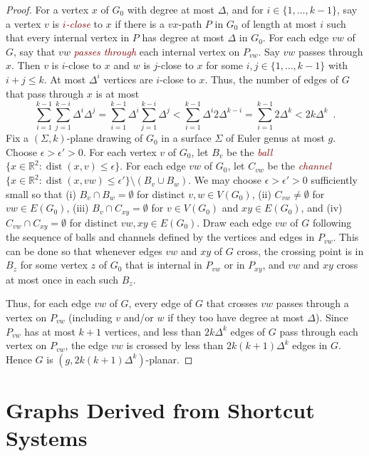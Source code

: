 \documentclass{patmorin}
\theoremstyle{plain}
\theoremstyle{definition}
\newcommand{\defin}[1]{\textcolor{Maroon}{\emph{#1}}}
\DeclareMathOperator{\dist}{dist}
\renewcommand{\leq}{\leqslant}
\begin{document}
\begin{proof}
  For a vertex $x$ of $G_0$ with degree at most $\Delta$, and for $i\in\{1,\dots,k-1\}$, say a vertex $v$ is \defin{$i$-close} to $x$ if there is a $vx$-path $P$ in $G_0$ of length at most $i$ such that every internal vertex in $P$  has degree at most $\Delta$ in $G_0$.
  For each edge $vw$ of $G$, say that $vw$ \defin{passes through} each internal vertex on $P_{vw}$.  Say $vw$ passes through $x$. Then $v$ is $i$-close to $x$ and $w$ is $j$-close to $x$ for some $i,j\in\{1,\dots,k-1\}$ with $i+j\leq k$. At most $\Delta^{i}$ vertices are $i$-close to $x$.
  Thus, the number of edges of $G$ that pass through $x$ is at most
  \[
  \sum_{i=1}^{k-1} \sum_{j=1}^{k-i} \Delta^i \Delta^j
  = \sum_{i=1}^{k-1} \Delta^i  \sum_{j=1}^{k-i} \Delta^j
  < \sum_{i=1}^{k-1} \Delta^i  2 \Delta^{k-i}
  = \sum_{i=1}^{k-1} 2\Delta^k
  < 2k \Delta^k \enspace.
  \]
  Fix a $(\Sigma,k)$-plane drawing of $G_0$ in a surface $\Sigma$ of Euler genus at most $g$. Choose $\epsilon>\epsilon'>0$.
  For each vertex $v$ of $G_0$, let $B_v$ be the \defin{ball} $\{x\in \mathbb{R}^2:\dist(x,v)\leq\epsilon\}$.
  For each edge $vw$ of $G_0$, let $C_{vw}$ be the \defin{channel} $\{x\in \mathbb{R}^2:\dist(x,vw)\leq\epsilon'\}\setminus(B_v\cup B_w)$.
  We may choose $\epsilon>\epsilon'>0$ sufficiently small so that
  (i) $B_v\cap B_w=\emptyset$ for distinct $v,w\in V(G_0)$,
  (ii) $C_{vw}\neq\emptyset$ for $vw\in E(G_0)$,
  (iii) $B_v\cap C_{xy}=\emptyset$ for $v\in V(G_0)$ and $xy\in E(G_0)$, and
  (iv) $C_{vw}\cap C_{xy}=\emptyset$ for distinct $vw,xy\in E(G_0)$.
  Draw each edge $vw$ of $G$ following the sequence of balls and channels defined by the vertices and edges in $P_{vw}$.
  This can be done so that whenever edges $vw$ and $xy$ of $G$ cross, the crossing point is in $B_z$ for some vertex $z$ of $G_0$ that is internal in $P_{vw}$ or in $P_{xy}$, and $vw$ and $xy$ cross at most once in each such $B_z$.

  Thus, for each edge $vw$ of $G$, every edge of $G$ that crosses $vw$ passes through a vertex on $P_{vw}$ (including $v$ and/or $w$ if they too have degree at most $\Delta$).
  Since $P_{vw}$ has at most $k+1$ vertices, and less than $2k\Delta^{k}$ edges of $G$ pass through each vertex on $P_{vw}$, the edge $vw$ is crossed by less than $2k(k+1)\Delta^{k}$ edges in $G$. Hence $G$ is $(g, 2k(k+1)\Delta^{k} )$-planar.
\end{proof}


\section{Graphs Derived from Shortcut Systems}
\label{examples}
\end{document}
